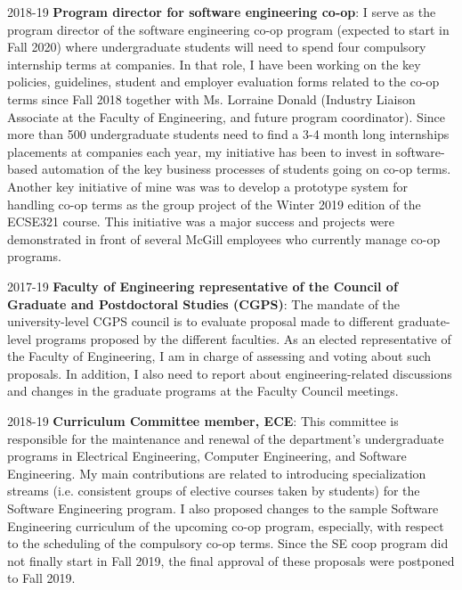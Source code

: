 \begin{yearlist}
\item[2018-19] \textbf{Program director for software engineering co-op}: 
I serve as the program director of the software engineering co-op program (expected to start in Fall 2020) where undergraduate students will need to spend four compulsory internship terms at companies. In that role, I have been working on the key policies, guidelines, student and employer evaluation forms related to the co-op terms since Fall 2018 together with Ms. Lorraine Donald (Industry Liaison Associate at the Faculty of Engineering, and future program coordinator). 
Since more than 500 undergraduate students need to find a 3-4 month long internships placements at companies each year, my initiative has been to invest in software-based automation of the key business processes of students going on co-op terms. Another key initiative of mine was was to develop a prototype system for handling co-op terms as the group project of the Winter 2019 edition of the ECSE321 course. This initiative was a major success and projects were demonstrated in front of several McGill employees who currently manage 
co-op programs. 



\item[2017-19] \textbf{Faculty of Engineering representative of the Council of Graduate and Postdoctoral Studies (CGPS)}: The mandate of the university-level CGPS council is to evaluate proposal made to different graduate-level programs proposed by the different faculties. As an elected representative of the Faculty of Engineering, I am in charge of assessing and voting about such proposals. In addition, I also need to report about engineering-related discussions and changes in the graduate programs at the Faculty Council meetings. 
\item[2018-19] \textbf{Curriculum Committee member, ECE}: 
This committee is responsible for the maintenance and renewal of the department’s undergraduate programs in Electrical Engineering, Computer Engineering, and Software Engineering. My main contributions are related to introducing specialization streams (i.e. consistent groups of elective courses taken by students) for the Software Engineering program. I also proposed changes to the sample Software Engineering curriculum of the upcoming co-op program, especially, with respect to the scheduling of the compulsory co-op terms. Since the SE coop program did not finally start in Fall 2019, the final approval of these proposals were postponed to Fall 2019.


\end{yearlist}
